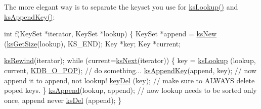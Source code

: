 The more elegant way is to separate the keyset you use for \hyperlink{group__keyset_gaa34fc43a081e6b01e4120daa6c112004}{ks\-Lookup()} and \hyperlink{group__keyset_gaa5a1d467a4d71041edce68ea7748ce45}{ks\-Append\-Key()}\-: 
\begin{DoxyCode}
\textcolor{keywordtype}{int} f(KeySet *iterator, KeySet *lookup)
\{
        KeySet *append = \hyperlink{group__keyset_ga671e1aaee3ae9dc13b4834a4ddbd2c3c}{ksNew} (\hyperlink{group__keyset_ga7474ad6b0a0fa969dbdf267ba5770eee}{ksGetSize}(lookup), KS\_END);
        Key *key;
        Key *current;

        \hyperlink{group__keyset_gabe793ff51f1728e3429c84a8a9086b70}{ksRewind}(iterator);
        \textcolor{keywordflow}{while} (current=\hyperlink{group__keyset_ga317321c9065b5a4b3e33fe1c399bcec9}{ksNext}(iterator))
        \{
                key = \hyperlink{group__keyset_gaa34fc43a081e6b01e4120daa6c112004}{ksLookup} (lookup, current, \hyperlink{group__kdb_gga98a3d6a4016c9dad9cbd1a99a9c2a45aa52fb5f2cc86773d393da62bebebf7984}{KDB\_O\_POP});
                \textcolor{comment}{// do something...}
                \hyperlink{group__keyset_gaa5a1d467a4d71041edce68ea7748ce45}{ksAppendKey}(append, key); \textcolor{comment}{// now append it to
       append, not lookup!}
                \hyperlink{group__key_ga3df95bbc2494e3e6703ece5639be5bb1}{keyDel} (key); \textcolor{comment}{// make sure to ALWAYS delete poped keys.}
        \}
        \hyperlink{group__keyset_ga21eb9c3a14a604ee3a8bdc779232e7b7}{ksAppend}(lookup, append);
        \textcolor{comment}{// now lookup needs to be sorted only once, append never}
        \hyperlink{group__keyset_ga27e5c16473b02a422238c8d970db7ac8}{ksDel} (append);
\}
\end{DoxyCode}



